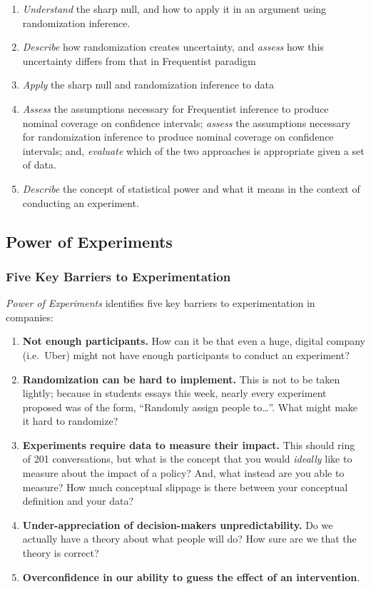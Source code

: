 \documentclass[
]{article}
\providecommand{\tightlist}{%
  \setlength{\itemsep}{0pt}\setlength{\parskip}{0pt}}
\theoremstyle{definition}
\theoremstyle{definition}
\theoremstyle{definition}
\theoremstyle{definition}
\theoremstyle{remark}
\begin{document}
\begin{enumerate}
\def\labelenumi{\arabic{enumi}.}
\tightlist
\item
  \emph{Understand} the sharp null, and how to apply it in an argument using randomization inference.
\item
  \emph{Describe} how randomization creates uncertainty, and \emph{assess} how this uncertainty differs from that in Frequentist paradigm
\item
  \emph{Apply} the sharp null and randomization inference to data
\item
  \emph{Assess} the assumptions necessary for Frequentist inference to produce nominal coverage on confidence intervals; \emph{assess} the assumptions necessary for randomization inference to produce nominal coverage on confidence intervals; and, \emph{evaluate} which of the two approaches is appropriate given a set of data.
\item
  \emph{Describe} the concept of statistical power and what it means in the context of conducting an experiment.
\end{enumerate}

\subsection{Power of Experiments}\label{power-of-experiments}

\subsubsection{Five Key Barriers to Experimentation}\label{five-key-barriers-to-experimentation}

\emph{Power of Experiments} identifies five key barriers to experimentation in companies:

\begin{enumerate}
\def\labelenumi{\arabic{enumi}.}
\tightlist
\item
  \textbf{Not enough participants.} How can it be that even a huge, digital company (i.e.~Uber) might not have enough participants to conduct an experiment?
\item
  \textbf{Randomization can be hard to implement.} This is not to be taken lightly; because in students essays this week, nearly every experiment proposed was of the form, ``Randomly assign people to\ldots{}''. What might make it hard to randomize?
\item
  \textbf{Experiments require data to measure their impact.} This should ring of 201 conversations, but what is the concept that you would \emph{ideally} like to measure about the impact of a policy? And, what instead are you able to measure? How much conceptual slippage is there between your conceptual definition and your data?\\
\item
  \textbf{Under-appreciation of decision-makers unpredictability.} Do we actually have a theory about what people will do? How sure are we that the theory is correct?\\
\item
  \textbf{Overconfidence in our ability to guess the effect of an intervention}.
\end{enumerate}
\end{document}
